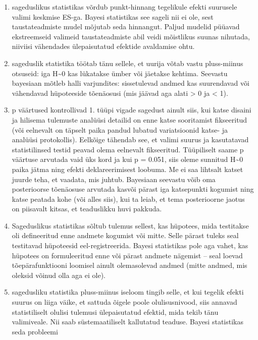 \documentclass[]{book}
\begin{document}
\begin{enumerate}
\def\labelenumi{\arabic{enumi}.}
\item
  sageduslikus statistikas võrdub punkt-hinnang tegelikule efekti
  suurusele valimi keskmise ES-ga. Bayesi statistikas see sageli nii ei
  ole, sest taustateadmiste mudel mõjutab seda hinnangut. Paljud mudelid
  püüavad ekstreemseid valimeid taustateadmiste abil veidi mõistlikus
  suunas nihutada, niiviisi vähendades ülepaisutatud efektide avaldamise
  ohtu.
\item
  sageduslik statistika töötab tänu sellele, et uurija võtab vastu
  pluss-miinus otsuseid: iga H\textasciitilde{}0 kas lükatakse ümber või
  jäetakse kehtima. Seevastu bayesiaan mõtleb halli varjundites:
  sissetulevad andmed kas suurendavad või vähendavad hüpoteeside
  tõenäosusi (mis jäävad aga alati \textgreater{} 0 ja \textless{} 1).
\item
  p väärtused kontrollivad 1. tüüpi vigade sagedust ainult siis, kui
  katse disaini ja hilisema tulemuste analüüsi detailid on enne katse
  sooritamist fikseeritud (või eelnevalt on täpselt paika pandud lubatud
  variatsioonid katse- ja analüüsi protokollis). Eelkõige tähendab see,
  et valimi suurus ja kasutatavad statistilinsed testid peavad olema
  eelnevalt fikseeritud. Tüüpiliselt saame p väärtuse arvutada vaid üks
  kord ja kui p = 0.051, siis oleme sunnitud H\textasciitilde{}0 paika
  jätma ning efekti deklareerimisest loobuma. Me ei saa lihtsalt katset
  juurde teha, et vaadata, mis juhtub. Bayesiaan seevastu võib oma
  posterioorse tõenäosuse arvutada kasvõi pärast iga katsepunkti
  kogumist ning katse peatada kohe (või alles siis), kui ta leiab, et
  tema posterioorne jaotus on piisavalt kitsas, et teaduslikku huvi
  pakkuda.
\item
  Sageduslikus statistikas sõltub tulemus sellest, kas hüpotees, mida
  testitakse oli defineeritud enne andmete kogumist või mitte. Selle
  pärast tuleks seal testitavad hüpoteesid eel-registreerida. Bayesi
  statistikas pole aga vahet, kas hüpotees on formuleeritud enne või
  pärast andmete nägemist -- seal loevad tõepärafunktiooni loomisel
  ainult olemasolevad andmed (mitte andmed, mis oleksid võinud olla aga
  ei ole).
\item
  sagedusliku statistika pluss-miinus iseloom tingib selle, et kui
  tegelik efekti suurus on liiga väike, et sattuda õigele poole
  olulisusnivood, siis annavad statistiliselt olulisi tulemusi
  ülepaisutatud efektid, mida tekib tänu valimiveale. Nii saab
  süstemaatiliselt kallutatud teaduse. Bayesi statistikas seda probleemi

\end{enumerate}
\end{document}
